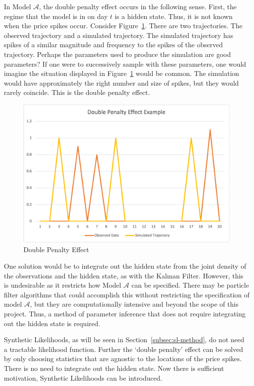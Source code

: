 In Model $\mathcal{A}$, the double penalty effect occurs in the following sense. First, the regime that the model is in on day $t$ is a hidden state. Thus, it is not known when the price spikes occur. Consider Figure~\ref{fig:double_penalty}. There are two trajectories. The observed trajectory and a simulated trajectory. The simulated trajectory has spikes of a similar magnitude and frequency to the spikes of the observed trajectory. Perhaps the parameters used to produce the simulation are good parameters? If one were to successively sample with these parameters, one would imagine the situation displayed in Figure~\ref{fig:double_penalty} would be common. The simulation would have approximately the right number and size of spikes, but they would rarely coincide. This is the double penalty effect.

\begin{figure}[H]
    \centering
    \includegraphics[width=12cm]{images/sl/double_penalty_excel.png}
    \caption{Double Penalty Effect \citep{haben_2014}}
    \label{fig:double_penalty}
\end{figure}

One solution would be to integrate out the hidden state from the joint density of the observations and the hidden state, as with the Kalman Filter. However, this is undesirable as it restricts how Model $\mathcal{A}$ can be specified. There may be particle filter algorithms that could accomplish this without restricting the specification of model $\mathcal{A}$, but they are computationally intensive and beyond the scope of this project. Thus, a method of parameter inference that does not require integrating out the hidden state is required.

Synthetic Likelihoods, as will be seen in Section~\ref{subsec:sl-method}, do not need a tractable likelihood function. Further the `double penalty' effect can be solved by only choosing statistics that are agnostic to the locations of the price spikes. There is no need to integrate out the hidden state. Now there is sufficient motivation, Synthetic Likelihoods can be introduced.


